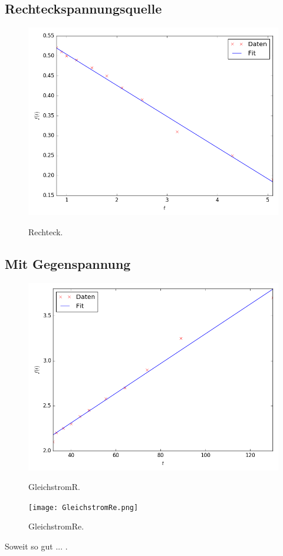 \subsection{Rechteckspannungsquelle}

\begin{figure}[H]
	\centering
	\caption{Rechteck.}
	\includegraphics[width=\linewidth-150pt,height=\textheight-150pt,keepaspectratio]{Rechteck.png}
	\label{fig:Rechteck}
\end{figure}



\subsection{ Mit Gegenspannung}

\begin{figure}[H]
	\centering
	\caption{GleichstromR.}
	\includegraphics[width=\linewidth-150pt,height=\textheight-150pt,keepaspectratio]{GleichstromR.png}
	\label{fig:GleichstromR}
\end{figure}


\begin{figure}[H]
	\centering
	\caption{GleichstromRe.}
	\texttt{[image: GleichstromRe.png]}
	\label{fig:GleichstromRe}
\end{figure}
\cite{scipy}
Soweit so gut ... .
